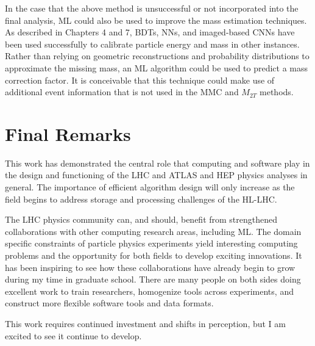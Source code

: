 In the case that the above method is unsuccessful or not incorporated into the final analysis, ML could also be used to improve the mass estimation techniques. As described in Chapters 4 and 7, BDTs, NNs, and imaged-based CNNs have been used successfully to calibrate particle energy and mass in other instances. Rather than relying on geometric reconstructions and probability distributions to approximate the missing mass, an ML algorithm could be used to predict a mass correction factor. It is conceivable that this technique could make use of additional event information that is not used in the MMC and $M_{2T}$ methods.

\section{Final Remarks}
This work has demonstrated the central role that computing and software play in the design and functioning of the LHC and ATLAS and HEP physics analyses in general. The importance of efficient algorithm design will only increase as the field begins to address storage and processing challenges of the HL-LHC.

The LHC physics community can, and should, benefit from strengthened collaborations with other computing research areas, including ML. The domain specific constraints of particle physics experiments yield interesting computing problems and the opportunity for both fields to develop exciting innovations. It has been inspiring to see how these collaborations have already begin to grow during my time in graduate school. There are many people on both sides doing excellent work to train researchers, homogenize tools across experiments, and construct more flexible software tools and data formats.

This work requires continued investment and shifts in perception, but I am excited to see it continue to develop.